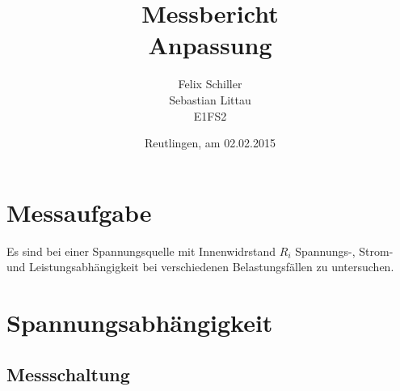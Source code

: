 \documentclass[
a4paper,     %
 headsepline, %
11pt         %
]{scrartcl}  %
\title{Messbericht \\ Anpassung}
\author{Felix Schiller \\ Sebastian Littau \\ E1FS2}
\date{Reutlingen, am 02.02.2015}
\begin{document}

\maketitle

\newpage
\tableofcontents





\section*{Messaufgabe}
Es sind bei einer Spannungsquelle mit Innenwidrstand $R_i$ Spannungs-, Strom- und Leistungsabhängigkeit bei verschiedenen Belastungsfällen zu untersuchen.

\section{Spannungsabhängigkeit}
\subsection{Messschaltung}
\end{document}
